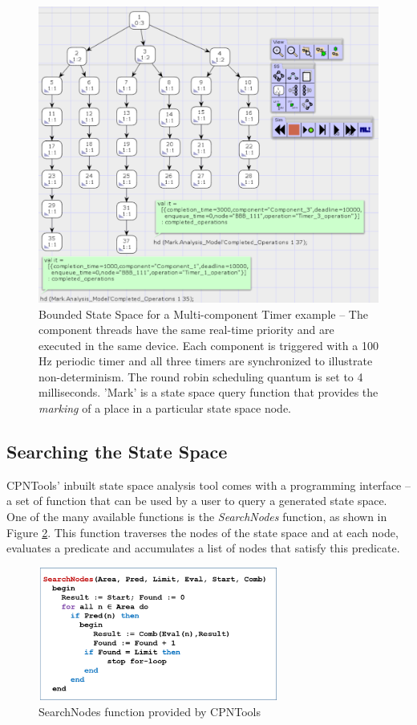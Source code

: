 \begin{figure}[htb]
	\centering
	\includegraphics[width=\textwidth]{./img/state-space-analysis.png}
	\caption{Bounded State Space for a Multi-component Timer example -- The component threads have the same real-time priority and are executed in the same device. Each component is triggered with a 100 Hz periodic timer and all three timers are synchronized to illustrate non-determinism. The round robin  scheduling quantum is set to 4 milliseconds. 'Mark' is a state space query function that provides the \emph{marking} of a place in a particular state space node.}
	\label{fig:SSScreenshot}
\end{figure}
\FloatBarrier

\subsection{Searching the State Space}

CPNTools' inbuilt state space analysis tool comes with a programming interface -- a set of function that can be used by a user to query a generated state space. One of the many available functions is the \emph{SearchNodes} function, as shown in Figure \ref{fig:SSSearching}. This function traverses the nodes of the state space and at each node, evaluates a predicate and accumulates a list of nodes that satisfy this predicate. 

\begin{figure}[htb]
	\centering
	\includegraphics[width=0.7\textwidth]{./img/state-space-searching.png}
	\caption{SearchNodes function provided by CPNTools}
	\label{fig:SSSearching}
\end{figure}
\FloatBarrier

